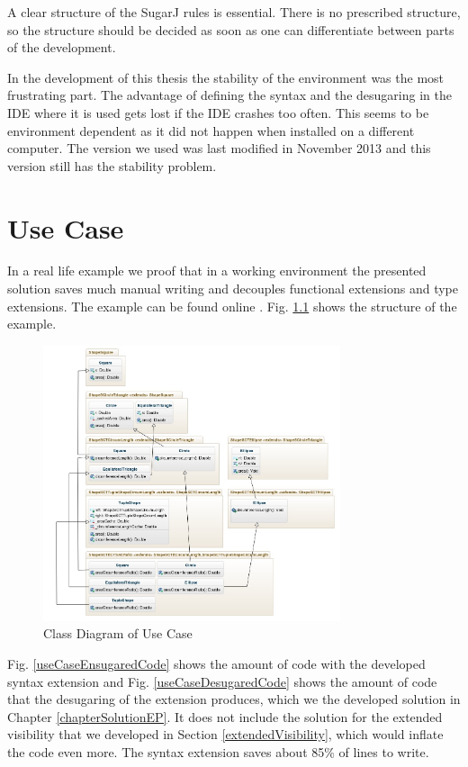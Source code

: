 \documentclass{report}
\begin{document}
A clear structure of the SugarJ rules is essential. There is no prescribed structure, so the structure should be decided as soon as one can differentiate between parts of the development.

In the development of this thesis the stability of the environment was the most frustrating part. The advantage of defining the syntax and the desugaring in the IDE where it is used gets lost if the IDE crashes too often. This seems to be environment dependent as it did not happen when installed on a different computer. The version we used was last modified in November 2013 and this version still has the stability problem.



\chapter{Use Case}
\vspace{-20pt}
In a real life example we proof that in a working environment the presented solution saves much manual writing and decouples functional extensions and type extensions. The example can be found online \cite{Peuscher-GitHub-EP-2014}. Fig. \ref{useCaseUMLDiagram} shows the structure of the example.

\begin{figure}[h]
\vspace{0pt}
\includegraphics[width=330px,keepaspectratio=true]{Expression_problem-diag2.jpg}
\vspace{-10pt}
\caption{Class Diagram of Use Case}
\label{useCaseUMLDiagram}
\end{figure}

Fig. \ref{useCaseEnsugaredCode} shows the amount of code with the developed syntax extension and Fig. \ref{useCaseDesugaredCode} shows the amount of code that the desugaring of the extension produces, which we the developed solution in Chapter \ref{chapterSolutionEP}. It does not include the solution for the extended visibility that we developed in Section \ref{extendedVisibility}, which would inflate the code even more. The syntax extension saves about 85\% of lines to write.
\end{document}
